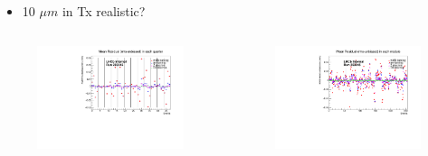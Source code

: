 \documentclass[aspectratio=1610, 12pt]{beamer}
\begin{document}
\begin{frame}
  \begin{itemize}
    \item 10 $\mu m$ in Tx realistic?
  \end{itemize}
  \begin{columns}
    \begin{column}[c]{0.48\textwidth}
      \begin{figure}
        \includegraphics[width=\textwidth]{plots/compi/RMSResidualQuarterscomp_choice.pdf}
      \end{figure}
    \end{column}
    \begin{column}[c]{0.48\textwidth}
      \begin{figure}
        \includegraphics[width=\textwidth]{plots/compi/RMSResidualModulescomp_choice.pdf}
      \end{figure}
    \end{column}
  \end{columns}
\end{frame}
\end{document}
